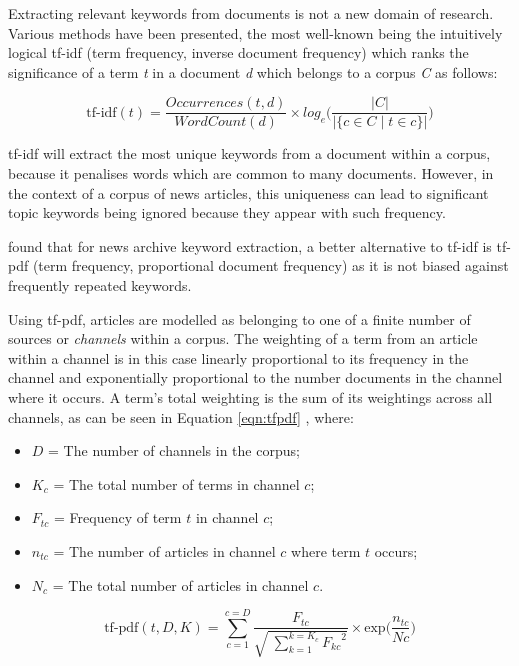 Extracting relevant keywords from documents is not a new domain of research. Various methods have been presented, the most well-known being the intuitively logical tf-idf (term frequency, inverse document frequency) \citep{TermWeightingApproachesInAutomaticTextRetrieval} which ranks the significance of a term \textit{t} in a document \textit{d} which belongs to a corpus \textit{C} as follows:

\begin{equation}
	\text{tf-idf}(t) = \frac{Occurrences(t, d)}{WordCount(d)} \times log_e\bigg(\frac{|C|}{|\{c \in C \mid t \in c\}|}\bigg)
\label{eqn:tfidf}
\end{equation}

tf-idf will extract the most unique keywords from a document within a corpus, because it penalises words which are common to many documents. However, in the context of a corpus of news articles, this uniqueness can lead to significant topic keywords being ignored because they appear with such frequency. 

\citet{TopicExtractionfromnewsArchiveUsingTFPDFAlgorithm} found that for news archive keyword extraction, a better alternative to tf-idf is tf-pdf (term frequency, proportional document frequency) as it is not biased against frequently repeated keywords.

Using tf-pdf, articles are modelled as belonging to one of a finite number of sources or \textit{channels} within a corpus. The weighting of a term from an article within a channel is in this case linearly proportional to its frequency in the channel and exponentially proportional to the number documents in the channel where it occurs. A term's total weighting is the sum of its weightings across all channels, as can be seen in Equation \ref{eqn:tfpdf} \citep{TopicExtractionfromnewsArchiveUsingTFPDFAlgorithm}, where:
\begin{itemize}[noitemsep]
	\item $D$ = The number of channels in the corpus;
	\item $K_c$ = The total number of terms in channel $c$;
	\item $F_{tc}$ = Frequency of term $t$ in channel $c$;
	\item $n_{tc}$ = The number of articles in channel $c$ where term $t$ occurs;
	\item $N_c$ = The total number of articles in channel $c$.
\end{itemize}
\begin{equation}
	\label{eqn:tfpdf}
	\text{tf-pdf}(t, D, K) = \sum_{c=1}^{c=D}\frac{F_{tc}}{\sqrt{\;\sum\limits_{k=1}^{k={K_c}}{F_{kc}}^2}}\times\text{exp}{\bigg(\frac{n_{tc}}{Nc}\bigg)}
\end{equation}

